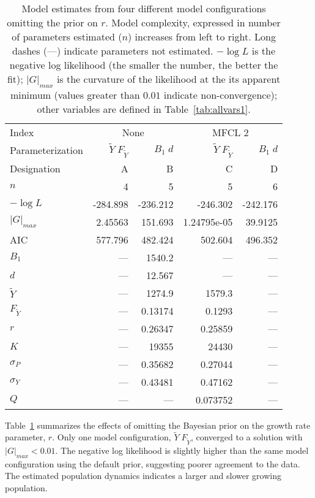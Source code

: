 \documentclass[12pt,letterpaper,twoside]{article}
\newcommand\MSY{\widetilde{Y}}
\newcommand\Fmsy{F_{\MSY}}
\newcommand\MSYFmsy{\MSY\;\Fmsy}
\newcommand\Bd{B_1\; d}
\begin{document}
\begin{table}[h]
\caption{
Model estimates from four different model configurations omitting the
prior on $r$.
Model complexity, expressed in number of parameters estimated ($n$)
increases from left to right. Long dashes (---) indicate parameters
not estimated. 
{%
$-\log L$ is the negative log likelihood (the smaller the number, the
better the fit);
$|G|_{max}$ is the curvature of the likelihood at the its apparent
minimum (values greater than $0.01$ indicate non-convergence);
other variables are defined in Table~\ref{tab:allvars1}.
}
\label{tag:ests4NOprior}}
\begin{center}
\begin{tabular}{|l|rr|rr|}
\hline
Index & \multicolumn{2}{c|}{None}&\multicolumn{2}{c|}{MFCL 2}\\
\cline{2-3}\cline{4-5}
Parameterization&$\MSYFmsy$&$\Bd$&$\MSYFmsy$&$\Bd$\\
Designation& A & B& C& D\\
\hline

\hline
$n$ & 4 & 5 & 5 & 6\\
$-\log L$ & -284.898 & -236.212 & -246.302 & -242.176\\
$|G|_{max}$ & 2.45563 & 151.693 & 1.24795e-05 & 39.9125\\
AIC & 577.796 & 482.424 & 502.604 & 496.352\\
\hline
$B_1$ & --- & 1540.2 & --- & ---\\
$d$ & --- & 12.567 & --- & ---\\
$\MSY$ & --- & 1274.9 & 1579.3 & ---\\
$\Fmsy$ & --- & 0.13174 & 0.1293 & ---\\
$r$ & --- & 0.26347 & 0.25859 & ---\\
$K$ & --- & 19355 & 24430 & ---\\
$\sigma_P$ & --- & 0.35682 & 0.27044 & ---\\
$\sigma_Y$ & --- & 0.43481 & 0.47162 & ---\\
$Q$ & --- & --- & 0.073752 & ---\\
\hline
\end{tabular}
\end{center}
\end{table}

Table~\ref{tag:ests4NOprior} summarizes the effects of omitting the
Bayesian prior on the growth rate parameter, $r$. Only one model
configuration, $\MSYFmsy$, converged to a solution with
$|G|_{max}<0.01$. The negative
log likelihood is slightly higher than the same model configuration
using the default prior, suggesting poorer agreement to the data. The
estimated population dynamics indicates a larger and slower growing
population.
\end{document}
